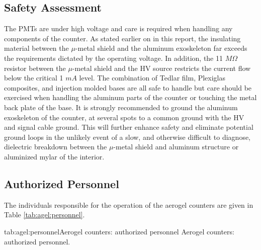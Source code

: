 \begin{safetyen}{10}{10}
\section{Safety Assessment}

The PMTs are under high voltage and care is required when handling any 
components of the counter. As stated earlier on in this report, the insulating 
material between the $\mu$-metal shield and the aluminum exoskeleton far 
exceeds the requirements dictated by the operating voltage. 
In addition, the 11 $M\Omega$ resistor between 
the $\mu$-metal shield and the HV source restricts the current flow below the  
critical 1 $mA$ level. The combination of Tedlar film, Plexiglas composites, 
and injection molded bases are all safe to handle but care should be 
exercised when handling the aluminum parts of the counter or touching the metal 
back plate of the base. It is strongly recommended to ground the aluminum 
exoskeleton of the counter, at several spots to a common ground with the HV 
and signal cable ground. This will further enhance safety and eliminate 
potential ground loops in the unlikely event of a slow, and otherwise difficult 
to diagnose, dielectric breakdown between the $\mu$-metal shield and aluminum 
structure or aluminized mylar of the interior.  

\end{safetyen}

\begin{safetyen}{10}{15}
\section{Authorized Personnel}
\end{safetyen}

The individuals responsible for the operation 
of the aerogel \Cherenkov{} counters are given in Table \ref{tab:agel:personnel}.

\begin{namestab}{tab:agel:personnel}{Aerogel counters: authorized personnel}{%
      Aerogel counters: authorized personnel.}
  \JackSegal{}
\end{namestab}

